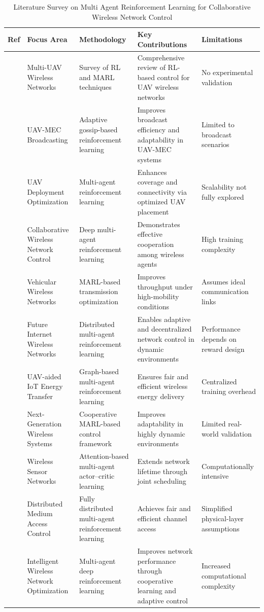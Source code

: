 \documentclass[a4paper,fleqn]{cas-dc}
\numberwithin{equation}{section}
\begin{document}
\begin{table}[htbp]
\centering
\caption{Literature Survey on Multi Agent Reinforcement Learning for Collaborative Wireless Network Control}
\label{tab:survey_r21_r30}
\begin{tabular}{|c|p{4cm}|p{4.5cm}|p{3.5cm}|p{3.5cm}|}
\hline
\textbf{Ref} & \textbf{Focus Area} & \textbf{Methodology} & \textbf{Key Contributions} & \textbf{Limitations} \\
\hline
\cite{bai2023toward} & Multi-UAV Wireless Networks & Survey of RL and MARL techniques & Comprehensive review of RL-based control for UAV wireless networks & No experimental validation \\
\hline
\cite{ren2023intelligent} & UAV-MEC Broadcasting & Adaptive gossip-based reinforcement learning & Improves broadcast efficiency and adaptability in UAV-MEC systems & Limited to broadcast scenarios \\
\hline
\cite{sharma2024deployment} & UAV Deployment Optimization & Multi-agent reinforcement learning & Enhances coverage and connectivity via optimized UAV placement & Scalability not fully explored \\
\hline
\cite{wang2024multi} & Collaborative Wireless Network Control & Deep multi-agent reinforcement learning & Demonstrates effective cooperation among wireless agents & High training complexity \\
\hline
\cite{srinivasan2024multi} & Vehicular Wireless Networks & MARL-based transmission optimization & Improves throughput under high-mobility conditions & Assumes ideal communication links \\
\hline
\cite{jamal2024hybrid} & Future Internet Wireless Networks & Distributed multi-agent reinforcement learning & Enables adaptive and decentralized network control in dynamic environments & Performance depends on reward design \\
\hline
\cite{zhao2023multi} & UAV-aided IoT Energy Transfer & Graph-based multi-agent reinforcement learning & Ensures fair and efficient wireless energy delivery & Centralized training overhead \\
\hline
\cite{sun2025age} & Next-Generation Wireless Systems & Cooperative MARL-based control framework & Improves adaptability in highly dynamic environments & Limited real-world validation \\
\hline
\cite{jiang2022attention} & Wireless Sensor Networks & Attention-based multi-agent actor--critic learning & Extends network lifetime through joint scheduling & Computationally intensive \\
\hline
\cite{farquhar2022distributed} & Distributed Medium Access Control & Fully distributed multi-agent reinforcement learning & Achieves fair and efficient channel access & Simplified physical-layer assumptions \\
\hline
\cite{liu2025communication} & Intelligent Wireless Network Optimization & Multi-agent deep reinforcement learning & Improves network performance through cooperative learning and adaptive control & Increased computational complexity \\
\hline
\end{tabular}
\end{table}
\end{document}
